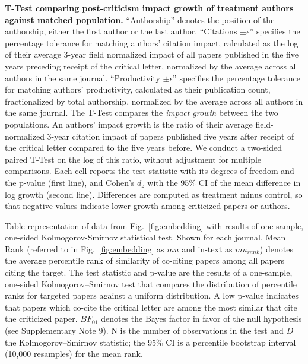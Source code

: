 \documentclass[12pt]{article} %
\begin{document}
\clearpage
\begin{landscape}
\begin{table}[p]
\scriptsize
\centering
\caption{
\textbf{T-Test comparing post-criticism impact growth of treatment authors against matched population.}
``Authorship'' denotes the position of the authorship, either the first author or the last author. 
``Citations $\pm \epsilon$'' specifies the percentage tolerance for matching authors' citation impact, calculated as the log of their average 3-year field normalized impact of all papers published in the five years preceding receipt of the critical letter, normalized by the average across all authors in the same journal. 
``Productivity $\pm \epsilon$'' specifies the percentage tolerance for matching authors' productivity, calculated as their publication count, fractionalized by total authorship, normalized by the average across all authors in the same journal.
The T-Test compares the \textit{impact growth} between the two populations. 
An authors' impact growth is the ratio of their average field-normalized 3-year citation impact of papers published five years after receipt of the critical letter compared to the five years before.
We conduct a two-sided paired T-Test on the log of this ratio, without adjustment for multiple comparisons.
Each cell reports the test statistic with its degrees of freedom and the p-value (first line), and Cohen's $d_z$ with the 95\% CI of the mean difference in log growth (second line). Differences are computed as treatment minus control, so that negative values indicate lower growth among criticized papers or authors. 
}
\label{si:tab:authors-matched-impact-ttest}
%
\end{table}
\end{landscape}





\clearpage
\begin{table}[p]
\scriptsize
\centering
\caption{
    Table representation of data from Fig.~\ref*{fig:embedding} with results of one-sample, one-sided Kolmogorov-Smirnov statistical test. Shown for each journal. Mean Rank (referred to in Fig.~\ref*{fig:embedding} as $mu$ and in-text as $mu_{rank}$) denotes the average percentile rank of similarity of co-citing papers among all papers citing the target.
    The test statistic and p-value are the results of a one-sample, one-sided Kolmogorov–Smirnov test that compares the distribution of percentile ranks for targeted papers against a uniform distribution. 
    A low p-value indicates that papers which co-cite the critical letter are among the most similar that cite the criticized paper.
$BF_{01}$ denotes the Bayes factor in favor of the null hypothesis (see Supplementary Note 9).
 N is the number of observations in the test and $D$ the Kolmogorov–Smirnov statistic; the 95\% CI is a percentile bootstrap interval (10,000 resamples) for the mean rank.
}
\label{si:table:embedding-tests} 
%
\end{table}
\end{document}
